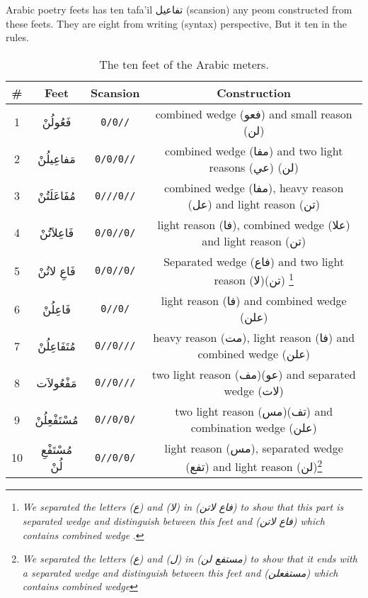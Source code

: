 Arabic poetry feets has ten tafa'il \textarabic{تفاعيل} (scansion)  any peom constructed from these feets. They are eight from writing (syntax) perspective, But it ten in the rules.
\begin{savenotes}

\begin{table}[H]
  \centering
  \begin{tabular}{|c|c|c|c|}
    \hline
    \textbf{\#} & \textbf{Feet} & \textbf{Scansion} & \textbf{Construction} \\
    \hline
    1 & \textarabic{فَعُولُنْ}  & \texttt{0/0//} & combined wedge (\textarabic{فعو}) and small reason (\textarabic{لن})   \\
    2 &\textarabic{مَفاعِيلُنْ}& \texttt{0/0/0//} & combined wedge (\textarabic{مفا}) and two light reasons (\textarabic{عي}) (\textarabic{لن})   \\
    3 &\textarabic{مُفَاعَلَتُنْ}& \texttt{0///0//}  &    combined wedge (\textarabic{مفا}), heavy reason (\textarabic{عل}) and light reason (\textarabic{تن}) \\
    4 &\textarabic{فَاعِلاَتُنْ} & \texttt{0/0//0/}   & light reason (\textarabic{فا}), combined wedge (\textarabic{علا}) and light reason (\textarabic{تن})   \\
    5 &\textarabic{فَاعِ لاتُنْ} & \texttt{0/0//0/}  &  Separated wedge (\textarabic{فاع}) and two light reason (\textarabic{لا})(\textarabic{تن}) \footnote{\textit{We separated the letters (\textarabic{ع}) and (\textarabic{لا}) in (\textarabic{فاع لاتن}) to show that this part is separated wedge and distinguish between this feet  and (\textarabic{فاع لاتن}) which contains combined wedge  }.}  \\    
    6 &\textarabic{فَاعِلُنْ}  & \texttt{0//0/}   & light reason (\textarabic{فا}) and combined wedge (\textarabic{علن})\\
    7 &\textarabic{مُتَفَاعِلُنْ}& \texttt{0//0///}  & heavy reason (\textarabic{مت}), light reason (\textarabic{فا}) and combined wedge (\textarabic{علن})  \\
    8 &\textarabic{مَفْعُولاَت} & \texttt{0//0///}   & two light reason (\textarabic{مف})(\textarabic{عو}) and separated wedge (\textarabic{لات}) \\
    9 &\textarabic{مُسْتَفْعِلُنْ} & \texttt{0//0/0/}  &  two light reason (\textarabic{مس})(\textarabic{تف}) and combination wedge (\textarabic{علن}) \\
    10 &\textarabic{مُسْتَفْعِ لُنْ} & \texttt{0//0/0/}  & light reason (\textarabic{مس}), separated wedge  (\textarabic{تفع}) and light reason  (\textarabic{لن})\footnote{\textit{We separated the letters (\textarabic{ع}) and (\textarabic{ل}) in (\textarabic{مستفع لن}) to show that it ends with a separated wedge and distinguish between this feet  and (\textarabic{مستفعلن}) which contains combined wedge }}\\
    
    
    \hline
  \end{tabular}
  \caption{The ten feet of the Arabic meters. }\label{arud:feet}
\end{table}
    \end{savenotes}

